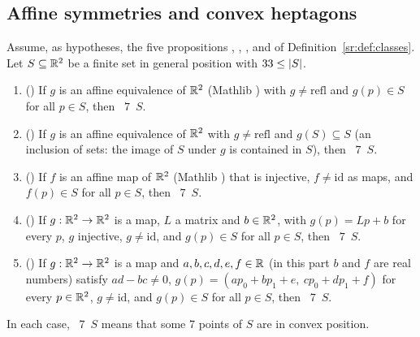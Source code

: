 \subsection{Affine symmetries and convex heptagons}

\begin{theorem}\label{ar:thm:main}
Assume, as hypotheses, the five propositions , , ,
 and  of Definition~\textup{\ref{sr:def:classes}}. Let $S\subseteq\mathbb R^2$ be a
finite set in general position with $33\le\lvert S\rvert$.
\begin{enumerate}[label=\textup{(\alph*)}]
\item \textup{(}\textup{)} If $g$ is an affine equivalence of $\mathbb R^2$
\textup(Mathlib \textup) with $g\ne\mathrm{refl}$ and $g(p)\in S$ for all $p\in S$, then
~$7$~$S$.
\item \textup{(}\textup{)} If $g$ is an affine equivalence of $\mathbb R^2$
with $g\ne\mathrm{refl}$ and $g(S)\subseteq S$ \textup(an inclusion of sets: the image of $S$ under $g$ is contained in
$S$\textup), then ~$7$~$S$.
\item \textup{(}\textup{)} If $f$ is an affine map of $\mathbb R^2$ \textup(Mathlib
\textup) that is injective, $f\ne\mathrm{id}$ as maps, and $f(p)\in S$ for all $p\in S$, then
~$7$~$S$.
\item \textup{(}\textup{)} If $g:\mathbb R^2\to\mathbb R^2$ is a map, $L$ a matrix and
$b\in\mathbb R^2$, with $g(p)=Lp+b$ for every $p$, $g$ injective, $g\ne\mathrm{id}$, and $g(p)\in S$ for all $p\in S$, then
~$7$~$S$.
\item \textup{(}\textup{)} If $g:\mathbb R^2\to\mathbb R^2$ is a map and
$a,b,c,d,e,f\in\mathbb R$ \textup(in this part $b$ and $f$ are real numbers\textup) satisfy $ad-bc\ne0$,
$g(p)=(ap_0+bp_1+e,\ cp_0+dp_1+f)$ for every $p\in\mathbb R^2$, $g\ne\mathrm{id}$, and $g(p)\in S$ for all $p\in S$, then
~$7$~$S$.
\end{enumerate}
In each case, ~$7$~$S$ means that some $7$ points of $S$ are in convex position.
\end{theorem}

